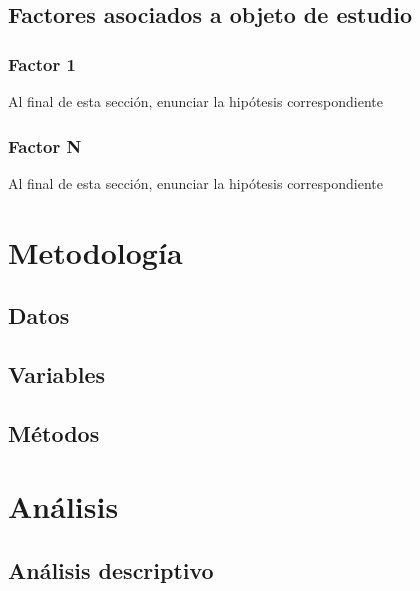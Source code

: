 \documentclass[12pt,twoside]{templates/facsothesis}
\begin{document}
\hypertarget{factores-asociados-a-objeto-de-estudio}{%
\section{Factores asociados a objeto de estudio}\label{factores-asociados-a-objeto-de-estudio}}

\hypertarget{factor-1}{%
\subsection{Factor 1}\label{factor-1}}

Al final de esta sección, enunciar la hipótesis correspondiente

\hypertarget{factor-n}{%
\subsection{Factor N}\label{factor-n}}

Al final de esta sección, enunciar la hipótesis correspondiente

\hypertarget{metodologuxeda}{%
\chapter{Metodología}\label{metodologuxeda}}

\hypertarget{datos}{%
\section{Datos}\label{datos}}

\hypertarget{variables}{%
\section{Variables}\label{variables}}

\hypertarget{muxe9todos}{%
\section{Métodos}\label{muxe9todos}}

\hypertarget{anuxe1lisis}{%
\chapter{Análisis}\label{anuxe1lisis}}

\hypertarget{anuxe1lisis-descriptivo}{%
\section{Análisis descriptivo}\label{anuxe1lisis-descriptivo}}
\end{document}
